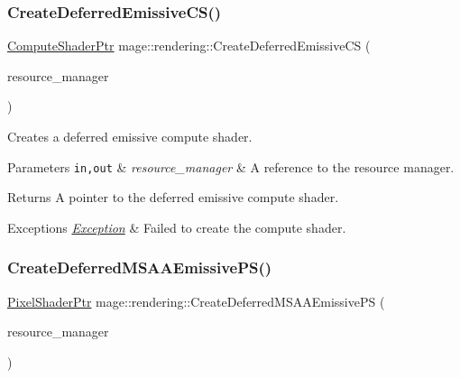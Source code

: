 \subsubsection{\texorpdfstring{Create\+Deferred\+Emissive\+C\+S()}{CreateDeferredEmissiveCS()}}
{\footnotesize\ttfamily \mbox{\hyperlink{namespacemage_1_1rendering_ab3dc9f2114f2e9255b91d9c051da52ea}{Compute\+Shader\+Ptr}} mage\+::rendering\+::\+Create\+Deferred\+Emissive\+CS (\begin{DoxyParamCaption}\item[{\mbox{\hyperlink{classmage_1_1rendering_1_1_resource_manager}{Resource\+Manager}} \&}]{resource\+\_\+manager }\end{DoxyParamCaption})}

Creates a deferred emissive compute shader.


\begin{DoxyParams}[1]{Parameters}
\mbox{\tt in,out}  & {\em resource\+\_\+manager} & A reference to the resource manager. \\
\hline
\end{DoxyParams}
\begin{DoxyReturn}{Returns}
A pointer to the deferred emissive compute shader. 
\end{DoxyReturn}

\begin{DoxyExceptions}{Exceptions}
{\em \mbox{\hyperlink{classmage_1_1_exception}{Exception}}} & Failed to create the compute shader. \\
\hline
\end{DoxyExceptions}
\mbox{\label{namespacemage_1_1rendering_ade6b1ffe4047baae6cf2743958a2101c}} 
\subsubsection{\texorpdfstring{Create\+Deferred\+M\+S\+A\+A\+Emissive\+P\+S()}{CreateDeferredMSAAEmissivePS()}}
{\footnotesize\ttfamily \mbox{\hyperlink{namespacemage_1_1rendering_af03d922b228ee9c8542baaa2ecc9f259}{Pixel\+Shader\+Ptr}} mage\+::rendering\+::\+Create\+Deferred\+M\+S\+A\+A\+Emissive\+PS (\begin{DoxyParamCaption}\item[{\mbox{\hyperlink{classmage_1_1rendering_1_1_resource_manager}{Resource\+Manager}} \&}]{resource\+\_\+manager }\end{DoxyParamCaption})}

